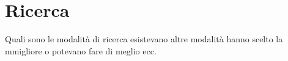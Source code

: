 \section{Ricerca} \label{Ricerca}
Quali sono le modalità di ricerca esistevano altre modalità hanno scelto la mmigliore o potevano fare di meglio ecc.